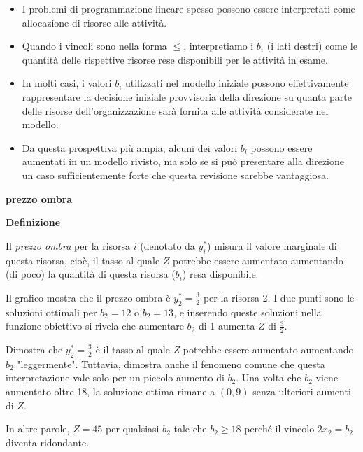 \documentclass[a4paper, 11pt]{article}
\begin{document}
        

        \begin{itemize}
            \item I problemi di programmazione lineare spesso possono essere interpretati come allocazione di risorse alle attività.
            \item Quando i vincoli sono nella forma $\leq$, interpretiamo i $b_i$ (i lati destri) come le quantità delle rispettive risorse rese disponibili per le attività in esame.
            \item In molti casi, i valori $b_i$ utilizzati nel modello iniziale possono effettivamente rappresentare la decisione iniziale provvisoria della direzione su quanta parte delle risorse dell'organizzazione sarà fornita alle attività considerate nel modello.
            \item Da questa prospettiva più ampia, alcuni dei valori $b_i$ possono essere aumentati in un modello rivisto, ma solo se si può presentare alla direzione un caso sufficientemente forte che questa revisione sarebbe vantaggiosa.
        \end{itemize}




        \textbf{prezzo ombra}

        \textbf{Definizione}

        Il \textit{prezzo ombra} per la risorsa $i$ (denotato da $y_i^*$) misura il valore marginale di questa risorsa, cioè, il tasso al quale $Z$ potrebbe essere aumentato aumentando (di poco) la quantità di questa risorsa ($b_i$) resa disponibile.





        Il grafico mostra che il prezzo ombra è $y_2^* = \frac{3}{2}$ per la risorsa 2. I due punti sono le soluzioni ottimali per $b_2 = 12$ o $b_2 = 13$, e inserendo queste soluzioni nella funzione obiettivo si rivela che aumentare $b_2$ di 1 aumenta $Z$ di $\frac{3}{2}$.

        Dimostra che $y_2^* = \frac{3}{2}$ è il tasso al quale $Z$ potrebbe essere aumentato aumentando $b_2$ "leggermente". Tuttavia, dimostra anche il fenomeno comune che questa interpretazione vale solo per un piccolo aumento di $b_2$. Una volta che $b_2$ viene aumentato oltre 18, la soluzione ottima rimane a $(0, 9)$ senza ulteriori aumenti di $Z$.

        In altre parole, $Z = 45$ per qualsiasi $b_2$ tale che $b_2 \geq 18$ perché il vincolo $2x_2 = b_2$ diventa ridondante.
\end{document}

